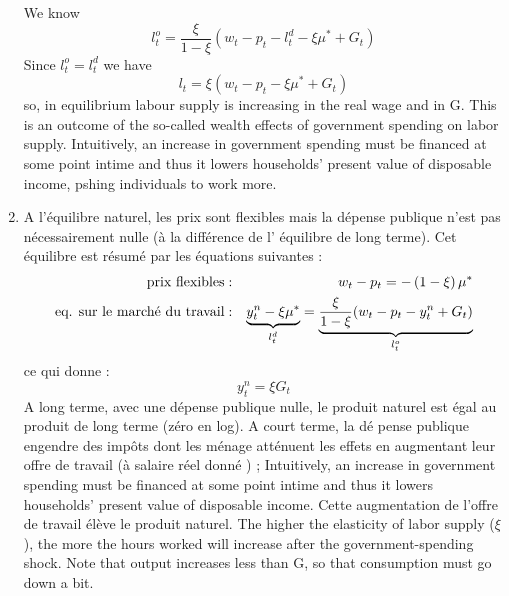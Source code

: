 \documentclass[a4paper,11pt]{article}
\begin{document}
\begin{enumerate}
We know \begin{equation*}
l_{t}^{o}=\frac{\xi}{1-\xi}(w_{t}-p_{t}- l_t^d - \xi \mu ^{\ast }+G_t) 
\end{equation*}
Since $l_t^o=l_t^d$ we have \begin{equation*}
l_{t}=\xi(w_{t}-p_{t}- \xi \mu ^{\ast }+G_t) 
\end{equation*}
so, in equilibrium labour supply is increasing in the real wage and in G.
 This is an outcome of the so-called wealth effects of government spending on labor supply. Intuitively, an increase in government spending must be financed at some point intime and thus it lowers households’ present value of disposable income, pshing individuals to work more. 

\item A l'\'{e}quilibre naturel, les prix sont flexibles mais la d\'{e}pense
publique n'est pas n\'{e}cessairement nulle (\`{a} la diff\'{e}rence de l'%
\'{e}quilibre de long terme). Cet \'{e}quilibre est r\'{e}sum\'{e} par les 
\'{e}quations suivantes :%
\begin{eqnarray*}
\text{prix flexibles} &:&w_{t}-p_{t}=-\left( 1-\xi \right) \mu ^{\ast } \\
\text{eq. sur le march\'{e} du travail} &:&\underset{l_{t}^{d}}{\underbrace{%
y_{t}^{n}-\xi \mu ^{\ast }}}=\underset{l_{t}^{o}}{\underbrace{\frac{\xi }{%
1-\xi }(w_{t}-p_{t}-y_{t}^{n}+G_{t})}}
\end{eqnarray*}%
ce qui donne :%
\begin{equation*}
y_{t}^{n}=\xi G_{t}
\end{equation*}%
A long terme, avec une d\'{e}pense publique nulle, le produit naturel est 
\'{e}gal au produit de long terme (z\'{e}ro en log). A court terme, la d\'{e}%
pense publique engendre des imp\^{o}ts dont les m\'{e}nage att\'{e}nuent les
effets en augmentant leur offre de travail (\`{a} salaire r\'{e}el donn\'{e}%
) ; Intuitively, an increase in government spending must be financed at some point intime and thus it lowers households’ present value of disposable income. Cette augmentation de l'offre de travail \'{e}l\`{e}ve le produit
naturel.  The  higher the elasticity of labor supply ($\xi$), the more the hours worked will increase after the government-spending shock. Note that output increases less than G, so that consumption must go down a bit. 



\end{enumerate}
\end{document}
